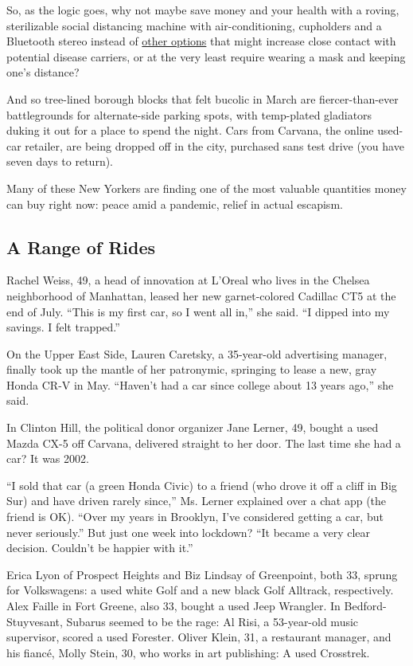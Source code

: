 So, as the logic goes, why not maybe save money and your health with a
roving, sterilizable social distancing machine with air-conditioning,
cupholders and a Bluetooth stereo instead of
\href{https://www.nytimes3xbfgragh.onion/2020/06/30/dining/restaurant-risks-coronavirus.html}{other
options} that might increase close contact with potential disease
carriers, or at the very least require wearing a mask and keeping one's
distance?

And so tree-lined borough blocks that felt bucolic in March are
fiercer-than-ever battlegrounds for alternate-side parking spots, with
temp-plated gladiators duking it out for a place to spend the night.
Cars from Carvana, the online used-car retailer, are being dropped off
in the city, purchased sans test drive (you have seven days to return).

Many of these New Yorkers are finding one of the most valuable
quantities money can buy right now: peace amid a pandemic, relief in
actual escapism.

\hypertarget{a-range-of-rides}{%
\subsection{A Range of Rides}\label{a-range-of-rides}}

Rachel Weiss, 49, a head of innovation at L'Oreal who lives in the
Chelsea neighborhood of Manhattan, leased her new garnet-colored
Cadillac CT5 at the end of July. ``This is my first car, so I went all
in,'' she said. ``I dipped into my savings. I felt trapped.''

On the Upper East Side, Lauren Caretsky, a 35-year-old advertising
manager, finally took up the mantle of her patronymic, springing to
lease a new, gray Honda CR-V in May. ``Haven't had a car since college
about 13 years ago,'' she said.

In Clinton Hill, the political donor organizer Jane Lerner, 49, bought a
used Mazda CX-5 off Carvana, delivered straight to her door. The last
time she had a car? It was 2002.

``I sold that car (a green Honda Civic) to a friend (who drove it off a
cliff in Big Sur) and have driven rarely since,'' Ms. Lerner explained
over a chat app (the friend is OK). ``Over my years in Brooklyn, I've
considered getting a car, but never seriously.'' But just one week into
lockdown? ``It became a very clear decision. Couldn't be happier with
it.''

Erica Lyon of Prospect Heights and Biz Lindsay of Greenpoint, both 33,
sprung for Volkswagens: a used white Golf and a new black Golf Alltrack,
respectively. Alex Faille in Fort Greene, also 33, bought a used Jeep
Wrangler. In Bedford-Stuyvesant, Subarus seemed to be the rage: Al Risi,
a 53-year-old music supervisor, scored a used Forester. Oliver Klein,
31, a restaurant manager, and his fiancé, Molly Stein, 30, who works in
art publishing: A used Crosstrek.

